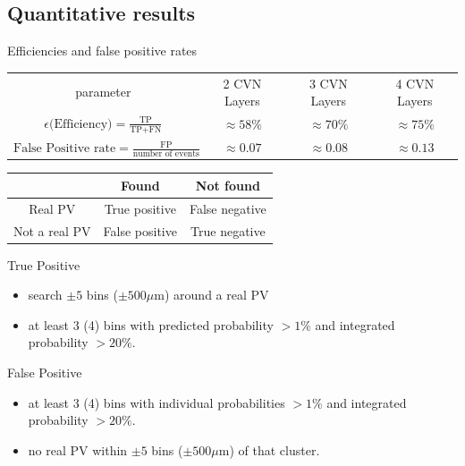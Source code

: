 \subsection{Quantitative results}
\begin{frame}{Efficiencies and false positive rates}
\begin{table}[]
\centering
\begin{tabular}{cccc}
parameter & 2 CVN Layers &
3 CVN Layers & 4 CVN Layers \\ [0.3em]

$\epsilon \textrm{(Efficiency)}
 = \frac{\mbox{TP}}{\mbox{TP} + \mbox{FN}} $
&  $ \approx 58\% $  & $ \approx 70\% $ & $ \approx 75\% $ \\ [0.3em]
$ \textrm{False Positive rate}
 = \frac{\mbox{FP}}{\mbox{number of events}} $
 &  $\approx 0.07 $ & $\approx 0.08 $  & $ \approx 0.13 $ \\
 \end{tabular}
\end{table}
 \vskip -0.05in
  \begin{table}[]
      \centering
      \begin{tabular}{c|cc}
         & Found & Not found \\ \midrule
         Real PV & True positive & False negative\\
         Not a real PV & False positive & True negative
      \end{tabular}
  \end{table}
  \vskip -0.15in
  \begin{block}{True Positive}
    \begin{itemize}
    	\item search $ \pm 5 $ bins ($ \pm 500 \mu $m) around a real PV
    	\item at least 3 (4) bins with predicted probability
    	   $ > 1\% $ and 
    	   integrated probability $ > 20\%$.
    \end{itemize}

    \end{block}
    \begin{block}{False Positive}
    \begin{itemize}
        \item
           at least 3 (4) bins with individual probabilities $ > 1\% $ and
          integrated probability $ > 20\%$.
        \item 
        no real PV within $ \pm 5 $ bins ($ \pm 500 \mu $m) of that cluster.
    \end{itemize}
  \end{block}
\end{frame}

